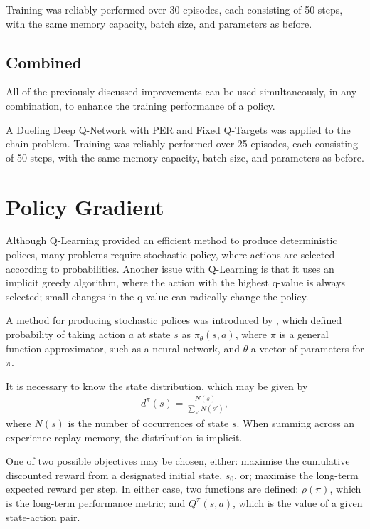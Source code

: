 Training was reliably performed over 30 episodes, each consisting of 50 steps,
with the same memory capacity, batch size, and parameters as before.



\subsection{Combined}

All of the previously discussed improvements can be used simultaneously, in any
combination, to enhance the training performance of a policy.

A Dueling Deep Q-Network with PER and Fixed Q-Targets was applied to the chain
problem.
Training was reliably performed over 25 episodes, each consisting of 50 steps,
with the same memory capacity, batch size, and parameters as before.



\section{Policy Gradient}

Although Q-Learning provided an efficient method to produce deterministic
polices, many problems require stochastic policy, where actions are selected
according to probabilities.
Another issue with Q-Learning is that it uses an implicit greedy algorithm,
where the action with the highest q-value is always selected; small changes in
the q-value can radically change the policy.

A method for producing stochastic polices was introduced by
\cite{Sutton:2000:Policy}, which defined probability of taking action $a$ at
state $s$ as $\pi_\theta(s,a)$, where $\pi$ is a general function approximator,
such as a neural network, and $\theta$ a vector of parameters for $\pi$.

It is necessary to know the state distribution, which may be given by
\begin{align*}
    d^\pi(s) = \frac{N(s)}{\sum_{s'} N(s')},
\end{align*}
where $N(s)$ is the number of occurrences of state $s$.
When summing across an experience replay memory, the distribution is implicit.

One of two possible objectives may be chosen, either:
maximise the cumulative discounted reward from a designated initial state,
$s_0$, or;
maximise the long-term expected reward per step.
In either case, two functions are defined:
$\rho(\pi)$, which is the long-term performance metric;
and $Q^\pi(s,a)$, which is the value of a given state-action pair.

